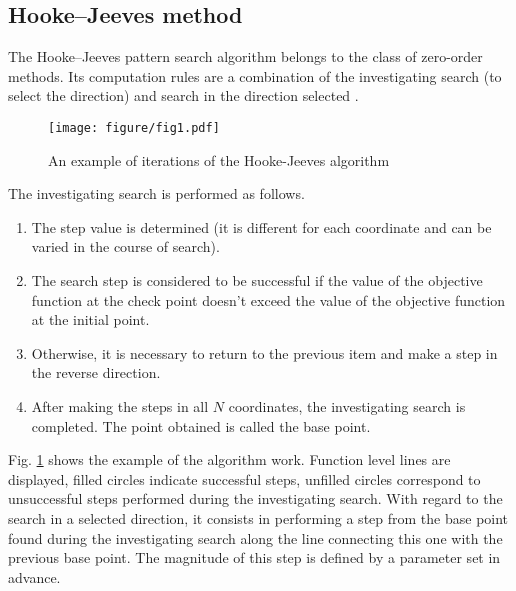 \documentclass{cmi}
\begin{document}
\subsection{Hooke--Jeeves method}\label{SecHG}

The Hooke--Jeeves pattern search algorithm belongs to the class of zero-order methods. Its computation rules are a  combination of the investigating search (to select the direction) and search in the direction selected  .

\begin{figure} 
	\begin{center} 
		\begin{minipage}[h]{0.8\linewidth} 
			\texttt{[image: figure/fig1.pdf]} 
			\caption{An example of iterations of the Hooke-Jeeves algorithm} %
			\label{fig:fig1} 
		\end{minipage} 
	\end{center} 
\end{figure}	


The investigating search is performed as follows.
\begin{enumerate} 
	\item	The step value is determined (it is different for each coordinate and can be varied in the course  of search).  
	\item	The search step is considered to be successful if the value of the objective function at the check  point doesn't exceed the value of the objective function at the initial point.  
	\item	Otherwise, it is necessary to return to the previous item and make a step in the reverse direction.  
	\item	After making the steps in all $N$ coordinates, the investigating search is completed. The point  obtained is called the base point. 
\end{enumerate}

Fig. \ref{fig:fig1} shows the example of the algorithm work. Function level lines are displayed, filled circles indicate successful steps, unfilled circles correspond to unsuccessful steps performed during the investigating search. With regard to the search in a selected direction, it consists in performing a step from the base point found during the investigating search along the line connecting this one with the previous base point. The magnitude of this step is defined by a parameter set in advance.
\end{document}
